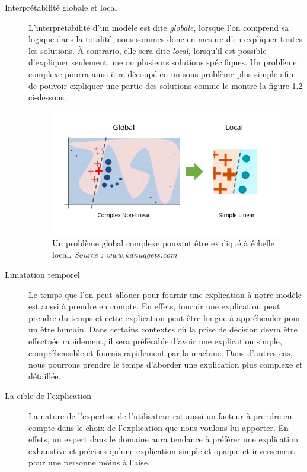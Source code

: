 \begin{description}
\item[Interprétabilité globale et local] L'interprétabilité d'un modèle est dite \textit{globale}, lorsque l'on comprend sa logique dans la totalité, nous sommes donc en mesure d'en expliquer toutes les solutions. À contrario, elle sera dite \textit{local}, lorsqu'il est possible d'expliquer seulement une ou plusieurs solutions spécifiques. Un problème complexe pourra ainsi être découpé en un sous problème plus simple afin de pouvoir expliquer une partie des solutions comme le montre la figure 1.2 ci-dessous.
\begin{figure}[h]
\centering
\includegraphics[scale=0.4]{src_img/globalVSlocal.png}
\caption{Un problème global complexe pouvant être expliqué à échelle local. \textit{Source : www.kdnuggets.com}}
\label{globalVSlocal}
\end{figure}

\item[Limatation temporel] Le temps que l'on peut allouer pour fournir une explication à notre modèle est aussi à prendre en compte. En effets, fournir une explication peut prendre du temps et cette explication peut être longue à appréhender pour un être humain. Dans certains contextes où la prise de décision devra être effectuée rapidement, il sera préférable d'avoir une explication simple, compréhensible et fournis rapidement par la machine. Dans d'autres cas, nous pourrons prendre le temps d'aborder une explication plus complexe et détaillée.

\item[La cible de l'explication] La nature de l'expertise de l'utilisateur est aussi un facteur à prendre en compte dans le choix de l'explication que nous voulons lui apporter. En effets, un expert dans le domaine aura tendance à préférer une explication exhaustive et précises qu'une explication simple et opaque et inversement pour une personne moins à l'aise.
\end{description}

